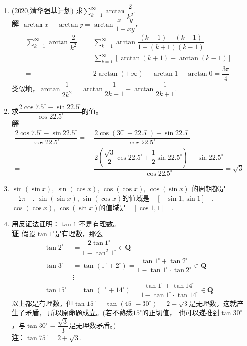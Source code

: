 \begin{enumerate}[label={【\textbf{例\thechapter.\arabic*}】},
 leftmargin=\inteval{\myenumleftmargin}pt,
 itemsep=\inteval{\myenumitempsep}pt,
 itemindent=\inteval{\myenumitemindent}pt]
\item (2020,清华强基计划) 求$ \sum\limits_{k=1}^{\infty}\arctan\dfrac{2}{k^2} $. 
\\ \textbf{解}\ $ \arctan x-\arctan y=\arctan\dfrac{x-y}{1+xy} $，
\begin{align*}
    \sum_{k=1}^{\infty}\arctan\dfrac{2}{k^2} 
    =&\ \sum_{k=1}^{\infty}\arctan\dfrac{(k+1)-(k-1)}{1+(k+1)(k-1)} \\
    =&\ \sum_{k=1}^{\infty}\left[
    \arctan(k+1)-\arctan(k-1) \right]\\
    =&\ 2\arctan(+\infty)-\arctan1-\arctan0=
    \dfrac{3\pi}{4}
\end{align*}
类似地，$ \arctan\dfrac{1}{2k^2}=\arctan\dfrac{1}{2k-1}-
\arctan\dfrac{1}{2k+1} $. 

\item 求$ \dfrac{2\cos7.5^{\circ}-\sin22.5^{\circ}}{\cos 22.5^{\circ}} $的值。\\
\textbf{解}\ 
\begin{align*}
    \dfrac{2\cos7.5^{\circ}-\sin22.5^{\circ}}{\cos 22.5^{\circ}}=&\ 
    \dfrac{2\cos(30^{\circ}-22.5^{\circ})-\sin22.5^{\circ}}{\cos 22.5^{\circ}}\\ 
    =&\ \dfrac{2(\dfrac{\sqrt{3}}{2}\cos22.5^{\circ}+\dfrac{1}{2}\sin22.5^{\circ})
        -\sin22.5^{\circ}}{\cos 22.5^{\circ}} = \sqrt{3}
\end{align*} 

\item $ \sin(\sin x),\ \sin(\cos x),\ \cos(\cos x),\ \cos(\sin x) $
的周期都是\underline{$\quad 2\pi \quad $}. $ \sin(\sin x)$, $
\sin(\cos x) $的值域是\underline{$\quad [-\sin 1,\sin 1] \quad$}. 
$ \cos(\cos x),\ \cos(\sin x) $的值域是\underline{$\quad
    [\cos 1,1] \quad $}. 

\item 用反证法证明：$ \tan 1^{\circ} $不是有理数。\\
\textbf{证}\ 假设$ \tan 1^{\circ} $是有理数，那么
\begin{align*}
    \tan 2^{\circ}&=\dfrac{2\tan 1^{\circ}}{1-\tan^2 1^{\circ}} \in \textbf{Q}\\
    \tan 3^{\circ}&=\tan (1^{\circ}+2^{\circ})=\dfrac{\tan 1^{\circ}
        +\tan 2^{\circ}}{1-\tan 1^{\circ}\cdot \tan 2^{\circ}} \in \textbf{Q} \\
    &\vdots \\
    \tan 15^{\circ}&=\tan (1^{\circ}+14^{\circ})=\dfrac{\tan 1^{\circ}+
        \tan 14^{\circ}}{1-\tan 1^{\circ}\cdot \tan 14^{\circ}} \in \textbf{Q}
\end{align*}
以上都是有理数，但$ \tan 15^{\circ}=\tan(45^{\circ}-
30^{\circ})=2-\sqrt{3} $是无理数，这就产生了矛盾，
所以原命题成立。(若不熟悉$ 15^{\circ} $的正切值，
也可以递推到$ \tan 30^{\circ} $，与$ \tan 30^{\circ}=\dfrac{\sqrt{3}}{3} $是无理数矛盾。)\\
\textbf{注}：$ \tan 75^{\circ}=2+\sqrt{3} $. 


\end{enumerate}
